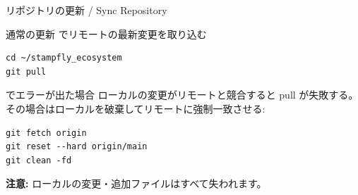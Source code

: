 \documentclass[aspectratio=169, 14pt]{beamer}
\begin{document}
\begin{frame}[fragile]{リポジトリの更新 / Sync Repository}
  \vspace{-0.3em}

  \begin{block}{通常の更新}
    {\small {} でリモートの最新変更を取り込む}
  \end{block}

  \vspace{-0.3em}

  \begin{lstlisting}[style=sfcpp]
cd ~/stampfly_ecosystem
git pull
  \end{lstlisting}

  \vspace{-0.2em}

  \begin{alertblock}{ でエラーが出た場合}
    {\footnotesize ローカルの変更がリモートと競合すると pull が失敗する。
    その場合はローカルを破棄してリモートに強制一致させる:}
  \end{alertblock}

  \vspace{-0.3em}

  \begin{lstlisting}[style=sfcpp]
git fetch origin
git reset --hard origin/main
git clean -fd
  \end{lstlisting}

  \vspace{-0.2em}

  {\scriptsize
  \textbf{注意:} ローカルの変更・追加ファイルはすべて失われます。
  }
\end{frame}
\end{document}
